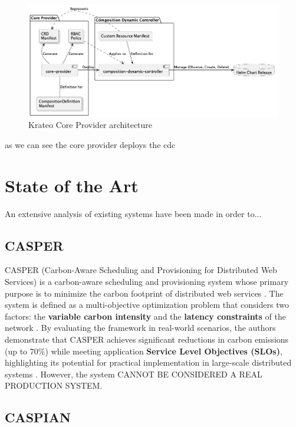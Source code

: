 \begin{figure}[htb]
    \centering
    \includegraphics[width=1\linewidth]{images/kraeto_core_provider.png}
    \caption{Krateo Core Provider architecture}
    \label{fig:krateo_core_provider}
\end{figure}

as we can see the core provider deploys the cdc




\section{State of the Art}
An extensive analysis of existing systems have been made in order to...

\subsection{CASPER}

CASPER (Carbon-Aware Scheduling and Provisioning for Distributed Web Services) is a carbon-aware scheduling and provisioning system whose primary purpose is to minimize the carbon footprint of distributed web services \cite{Souza_2023}.
The system is defined as a multi-objective optimization problem that considers two factors: the \textbf{variable carbon intensity} and the \textbf{latency constraints} of the network \cite{Souza_2023}.
By evaluating the framework in real-world scenarios, the authors demonstrate that CASPER achieves significant reductions in carbon emissions (up to 70\%) while meeting application \textbf{Service Level Objectives (SLOs)}, highlighting its potential for practical implementation in large-scale distributed systems \cite{Souza_2023}. However, the system CANNOT BE CONSIDERED A REAL PRODUCTION SYSTEM.




\subsection{CASPIAN}

